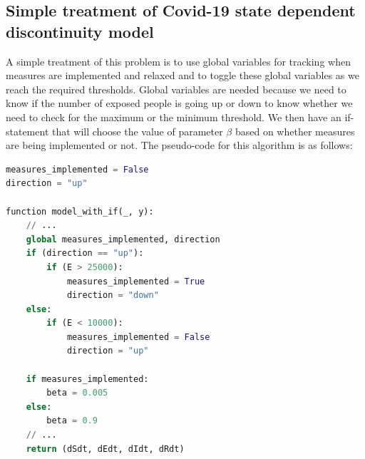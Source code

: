 \subsection{Simple treatment of Covid-19 state dependent discontinuity model}
\label{subsection:naive_state_problem}
A simple treatment of this problem is to use global variables for tracking when measures are implemented and relaxed and to toggle these global variables as we reach the required thresholds. Global variables are needed because we need to know if the number of exposed people is going up or down to know whether we need to check for the maximum or the minimum threshold. We then have an if-statement that will choose the value of parameter $\beta$ based on whether measures are being implemented or not. The pseudo-code for this algorithm is as follows:

\begin{minipage}{\linewidth}
\begin{lstlisting}[language=Python]
measures_implemented = False
direction = "up"

function model_with_if(_, y):
    // ...
    global measures_implemented, direction
    if (direction == "up"):
        if (E > 25000):
            measures_implemented = True
            direction = "down"
    else:
        if (E < 10000):
            measures_implemented = False
            direction = "up"

    if measures_implemented:
        beta = 0.005 
    else:
        beta = 0.9
    // ...
    return (dSdt, dEdt, dIdt, dRdt)
\end{lstlisting}
\end{minipage}

